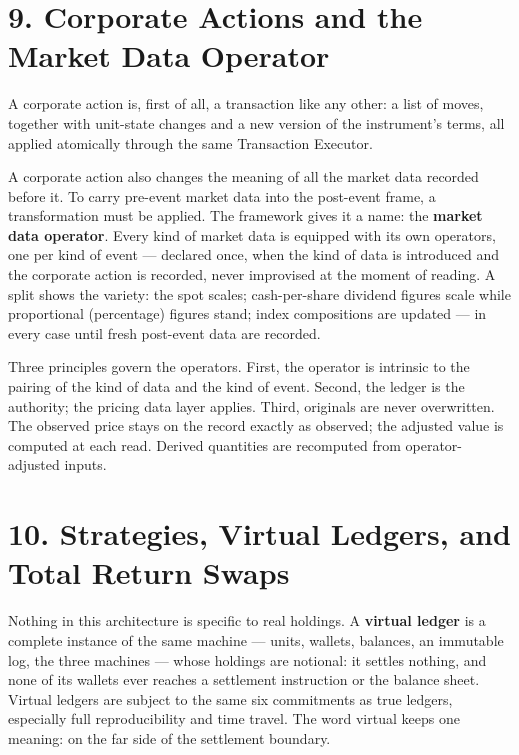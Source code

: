 \documentclass[11pt,a4paper]{article}
\begin{document}
\hypertarget{corporate-actions-and-the-market-data-operator}{%
\section{9. Corporate Actions and the Market Data
Operator}\label{corporate-actions-and-the-market-data-operator}}

A corporate action is, first of all, a transaction like any other: a
list of moves, together with unit-state changes and a new version of the
instrument's terms, all applied atomically through the same Transaction
Executor.

A corporate action also changes the meaning of all the market data
recorded before it. To carry pre-event market data into the post-event
frame, a transformation must be applied. The framework gives it a name:
the \textbf{market data operator}. Every kind of market data is equipped
with its own operators, one per kind of event --- declared once, when
the kind of data is introduced and the corporate action is recorded,
never improvised at the moment of reading. A split shows the variety:
the spot scales; cash-per-share dividend figures scale while
proportional (percentage) figures stand; index compositions are updated
--- in every case until fresh post-event data are recorded.

Three principles govern the operators. First, the operator is intrinsic
to the pairing of the kind of data and the kind of event. Second, the
ledger is the authority; the pricing data layer applies. Third,
originals are never overwritten. The observed price stays on the record
exactly as observed; the adjusted value is computed at each read.
Derived quantities are recomputed from operator-adjusted inputs.

\hypertarget{strategies-virtual-ledgers-and-total-return-swaps}{%
\section{10. Strategies, Virtual Ledgers, and Total Return
Swaps}\label{strategies-virtual-ledgers-and-total-return-swaps}}

Nothing in this architecture is specific to real holdings. A
\textbf{virtual ledger} is a complete instance of the same machine ---
units, wallets, balances, an immutable log, the three machines --- whose
holdings are notional: it settles nothing, and none of its wallets ever
reaches a settlement instruction or the balance sheet. Virtual ledgers
are subject to the same six commitments as true ledgers, especially full
reproducibility and time travel. The word virtual keeps one meaning: on
the far side of the settlement boundary.
\end{document}
